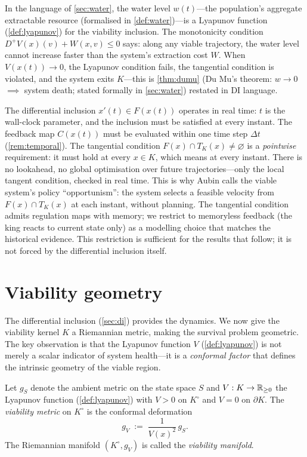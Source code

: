 In the language of \cref{sec:water}, the water level $w(t)$---the
population's aggregate extractable resource (formalised in
\cref{def:water})---is a Lyapunov function (\cref{def:lyapunov})
for the viability inclusion.
The monotonicity condition $D^+ V(x)(v) + W(x,v) \leq 0$ says: along
any viable trajectory, the water level cannot increase faster than the
system's extraction cost $W$.  When $V(x(t)) \to 0$, the Lyapunov
condition fails, the tangential condition is violated, and the system
exits $K$---this is \cref{thm:dumu} (Du Mu's theorem: $w \to 0$
$\implies$ system death; stated formally in \cref{sec:water})
restated in DI language.

\begin{remark}\label{rem:di-temporal}
The differential inclusion $x'(t) \in F(x(t))$ operates in real
time: $t$ is the wall-clock parameter, and the inclusion must be
satisfied at every instant.  The feedback map $C(x(t))$ must be
evaluated within one time step $\Delta t$ (\cref{rem:temporal}).
The tangential condition $F(x) \cap T_K(x) \neq \varnothing$
is a \emph{pointwise} requirement: it must hold at every $x \in K$,
which means at every instant.  There is no lookahead, no global
optimisation over future trajectories---only the local tangent
condition, checked in real time.  This is why Aubin calls the
viable system's policy ``opportunism'': the system selects a
feasible velocity from $F(x) \cap T_K(x)$ at each instant, without
planning.  The tangential condition admits regulation maps with
memory; we restrict to memoryless feedback (the king reacts to
current state only) as a modelling choice that matches the historical
evidence.  This restriction is sufficient for the results that
follow; it is not forced by the differential inclusion itself.
\end{remark}

\section{Viability geometry}\label{sec:viab-geom}

The differential inclusion (\cref{sec:di}) provides the dynamics.
We now give the viability kernel $K$ a Riemannian metric, making the
survival problem geometric.  The key observation is that the Lyapunov
function $V$ (\cref{def:lyapunov}) is not merely a scalar indicator of
system health---it is a \emph{conformal factor} that defines the
intrinsic geometry of the viable region.

\begin{definition}\label{def:viab-metric}
Let $g_S$ denote the ambient metric on the state space $S$ and
$V: K \to \mathbb{R}_{\geq 0}$ the Lyapunov function (\cref{def:lyapunov})
with $V > 0$ on $K^\circ$ and $V = 0$ on $\partial K$.
The \emph{viability metric} on $K^\circ$ is the conformal deformation
\[
  g_V \;:=\; \frac{1}{V(x)^2}\, g_S.
\]
The Riemannian manifold $(K^\circ, g_V)$ is called the
\emph{viability manifold}.
\end{definition}

